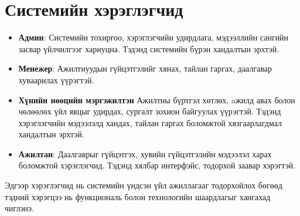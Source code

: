 \section{Системийн хэрэглэгчид}
\begin{itemize}
    \item \textbf{Админ}: Системийн тохиргоо, хэрэглэгчийн удирдлага, мэдээллийн 
    сангийн засвар үйлчилгээг хариуцна. Тэдэнд системийн бүрэн хандалтын эрхтэй.
    \item \textbf{Менежер}: Ажилтнуудын гүйцэтгэлийг хянах, тайлан гаргах, даалгавар 
    хуваарилах үүрэгтэй.
    \item \textbf{Хүнийн нөөцийн мэргэжилтэн} Ажилтны бүртгэл хөтлөх, aжилд авах болон чөлөөлөх 
    үйл явцыг удирдах, сургалт зохион байгуулах үүрэгтэй. Тэдэнд хэрэглэгчийн мэдээлэлд хандах, 
    тайлан гаргах боломжтой хязгаарлагдмал хандалтын эрхтэй.
    \item \textbf{Ажилтан}: Даалгаврыг гүйцэтгэх, хувийн гүйцэтгэлийн мэдээлэл харах 
    боломжтой хэрэглэгчид. Тэдэнд хялбар интерфэйс, тодорхой заавар хэрэгтэй.
\end{itemize}
Эдгээр хэрэглэгчид нь системийн үндсэн үйл ажиллагааг тодорхойлох бөгөөд тэдний хэрэгцээ нь функциональ болон технологийн шаардлагыг хангахад чиглэнэ.